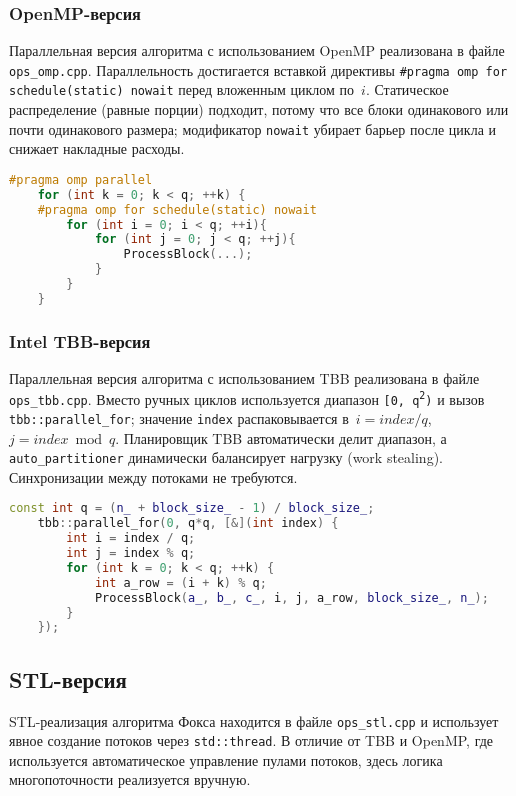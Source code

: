 \documentclass[12pt,a4paper]{extarticle}
\begin{document}
\subsubsection*{OpenMP-версия}
Параллельная версия алгоритма с использованием OpenMP реализована в файле \texttt{ops\_omp.cpp}.
Параллельность достигается вставкой директивы
\texttt{\#pragma omp for schedule(static)\,nowait}
перед вложенным циклом по~$i$.
Статическое распределение (равные порции) подходит, потому что все блоки одинакового
или почти одинакового размера; модификатор \texttt{nowait} убирает барьер
после цикла и снижает накладные расходы.

\begin{lstlisting}[language=C++,basicstyle=\ttfamily\small,
	caption={Различия OpenMP},
	label={lst:omp}]
	#pragma omp parallel
	for (int k = 0; k < q; ++k) {
	#pragma omp for schedule(static) nowait
		for (int i = 0; i < q; ++i){
			for (int j = 0; j < q; ++j){
				ProcessBlock(...);
			}
		}
	}
\end{lstlisting}

\subsubsection*{Intel TBB-версия}
Параллельная версия алгоритма с использованием TBB реализована в файле \texttt{ops\_tbb.cpp}.
Вместо ручных циклов используется диапазон
\texttt{[0,\,q{\textsuperscript{2}})} и вызов
\texttt{tbb::parallel\_for}; значение \texttt{index} распаковывается
в~$i=index/q$, $j=index\bmod q$.
Планировщик TBB автоматически делит диапазон, а
\texttt{auto\_partitioner} динамически балансирует нагрузку
(work stealing). Синхронизации между потоками не требуются.

\begin{lstlisting}[language=C++,basicstyle=\ttfamily\small,
	caption={Различия TBB},
	label={lst:tbb}]
	const int q = (n_ + block_size_ - 1) / block_size_;
	tbb::parallel_for(0, q*q, [&](int index) {
		int i = index / q;
		int j = index % q;
		for (int k = 0; k < q; ++k) {
			int a_row = (i + k) % q;
			ProcessBlock(a_, b_, c_, i, j, a_row, block_size_, n_);
		}
	});
\end{lstlisting}
\subsection*{STL-версия}

STL-реализация алгоритма Фокса находится в файле \texttt{ops\_stl.cpp} и использует явное создание потоков через \texttt{std::thread}.  
В отличие от TBB и OpenMP, где используется автоматическое управление пулами потоков, здесь логика многопоточности реализуется вручную.
\end{document}

